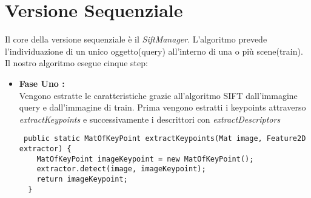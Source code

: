 \section{Versione Sequenziale}
Il core della versione sequenziale è il \emph{\textit{SiftManager}}. L'algoritmo prevede l'individuazione di un unico oggetto(query) all'interno di una o più scene(train). Il nostro algoritmo esegue cinque step:
\begin{itemize}
\item \textbf{Fase Uno :}\\
Vengono estratte le caratteristiche grazie all'algoritmo SIFT dall'immagine query e dall'immagine di train.
Prima vengono estratti i keypoints attraverso \emph{\textit{extractKeypoints}} e successivamente i descrittori con \emph{\textit{extractDescriptors}}
\begin{lstlisting}
 public static MatOfKeyPoint extractKeypoints(Mat image, Feature2D extractor) {
    MatOfKeyPoint imageKeypoint = new MatOfKeyPoint();
    extractor.detect(image, imageKeypoint);
    return imageKeypoint;
  }


\end{lstlisting}
\end{itemize}
